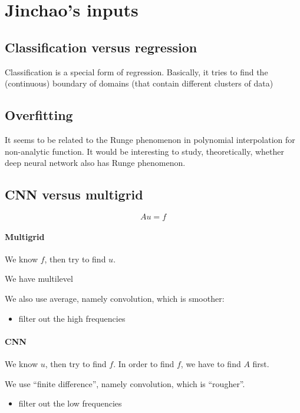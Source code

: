 \section{Jinchao's inputs}

\subsection{Classification versus regression}
Classification is a special form of regression.   Basically, it tries to find the (continuous) boundary of domains (that contain different clusters of data)

\subsection{Overfitting}

It seems to be related to the Runge phenomenon in polynomial interpolation for non-analytic function.  It would be interesting to study, theoretically, whether deep neural network also has Runge phenomenon.  

\subsection{CNN versus multigrid}
$$
Au=f
$$

\paragraph{Multigrid}

We know $f$, then try to find $u$.

We have multilevel

We also use average, namely convolution, which is smoother:

\begin{itemize}
\item filter out the high frequencies
\end{itemize}

\paragraph{CNN}
We know $u$, then try to find $f$.  In order to find $f$, we have to find $A$ first. 

We use ``finite difference'', namely convolution, which is ``rougher''.
\begin{itemize}
\item filter out the low frequencies
\end{itemize}


